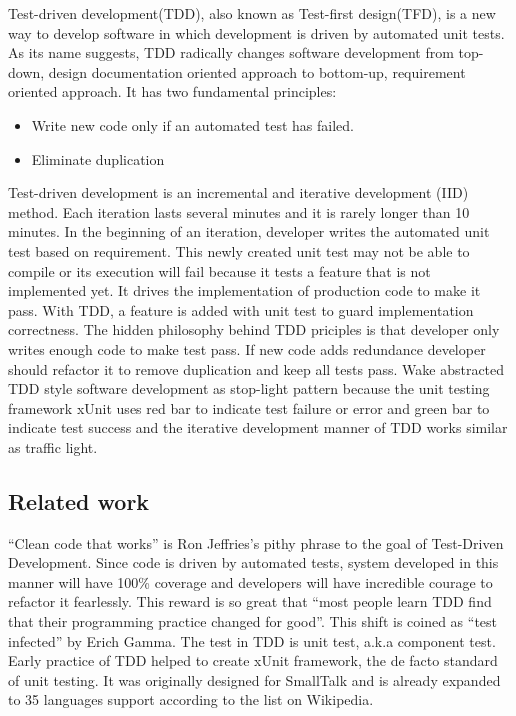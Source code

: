 Test-driven development(TDD), also known as Test-first design(TFD), is a
new way to develop software in which development is driven by automated
unit tests. As its name suggests, TDD radically changes software
development from top-down, design documentation oriented approach to
bottom-up, requirement oriented approach. It has two fundamental
principles\cite{Beck:03}: {\it
\begin{itemize}
\item Write new code only if an automated test has failed.
\item Eliminate duplication
\end{itemize}
} Test-driven development is an incremental and iterative development (IID)
method. Each iteration lasts several minutes and it is rarely longer than
10 minutes. In the beginning of an iteration, developer writes the
automated unit test based on requirement. This newly created unit test may
not be able to compile or its execution will fail because it tests a
feature that is not implemented yet. It drives the implementation of
production code to make it pass. With TDD, a feature is added with unit
test to guard implementation correctness. The hidden philosophy behind TDD
priciples is that developer only writes enough code to make test pass. If
new code adds redundance developer should refactor it to remove duplication
and keep all tests pass. Wake\cite{StopLight} abstracted TDD style software
development as stop-light pattern because the unit testing framework xUnit
uses red bar to indicate test failure or error and green bar to indicate
test success and the iterative development manner of TDD works similar as
traffic light.

\subsection{Related work}
``Clean code that works'' is Ron Jeffries's pithy phrase to the goal of
Test-Driven Development\cite{Beck:03}. Since code is driven by automated
tests, system developed in this manner will have 100\% coverage and
developers will have incredible courage to refactor it fearlessly. This
reward is so great that ``most people learn TDD find that their programming
practice changed for good''\cite{Beck:03}. This shift is coined as ``test
infected'' by Erich Gamma. The test in TDD is unit test, a.k.a component
test. Early practice of TDD helped to create xUnit framework, the de facto
standard of unit testing. It was originally designed for SmallTalk and is
already expanded to 35 languages support according to the list on
Wikipedia\cite{xUnit}.

